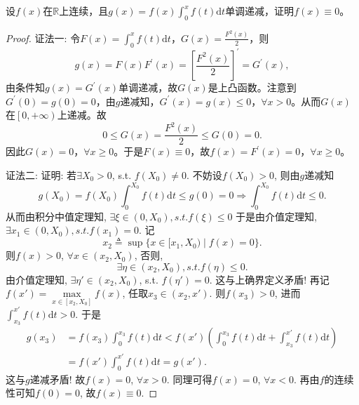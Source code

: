 \documentclass[../../main.tex]{subfiles}%
\begin{document}
\begin{example}
设$f(x)$在$\mathbb{R}$上连续，且$g(x)=f(x)\int_0^x f(t)\mathrm{d}t$单调递减，证明$f(x)\equiv 0$。
\end{example}
\begin{proof}

{\color{blue}证法一:}
令$F\left( x \right) =\int_0^x{f\left( t \right) \mathrm{d}t}$，$G\left( x \right) =\frac{F^2\left( x \right)}{2}$，则
\[
g\left( x \right) =F\left( x \right) F^\prime \left( x \right) =\left[ \frac{F^2\left( x \right)}{2} \right] ^\prime =G^\prime \left( x \right),
\]
由条件知$g\left( x \right) =G^\prime \left( x \right)$单调递减，故$G\left( x \right)$是上凸函数。注意到$G^\prime \left( 0 \right) =g\left( 0 \right) =0$，由$g$递减知，$G^\prime \left( x \right) =g\left( x \right) \leqslant 0$，$\forall x>0$。从而$G\left( x \right)$在$\left[ 0,+\infty \right)$上递减。故
\[
0\leqslant G\left( x \right) =\frac{F^2\left( x \right)}{2}\leqslant G\left( 0 \right) =0.
\]
因此$G\left( x \right) =0$，$\forall x\geqslant 0$。于是$F\left( x \right) \equiv 0$，故$f\left( x \right) =F^\prime \left( x \right) =0$，$\forall x\geqslant 0$。

{\color{blue}证法二:}
证明: 若$\exists X_0>0$, s.t. $f(X_0)\neq 0$. 不妨设$f(X_0)>0$,
则由$g$递减知
$$g(X_0)=f(X_0)\int_0^{X_0} f(t)\mathrm{d}t \leqslant g(0)=0 \Rightarrow \int_0^{X_0} f(t)\mathrm{d}t \leqslant 0.$$
从而由积分中值定理知, $\exists \xi \in (0,X_0), s.t. f(\xi) \leqslant 0$
于是由介值定理知, $\exists x_1 \in (0,X_0), s.t. f(x_1)=0.$
记
$$x_2 \triangleq \sup\{x \in [x_1,X_0) \mid f(x)=0\}.$$
则$f(x)>0$, $\forall x \in (x_2,X_0)$, 否则, $$\exists \eta \in (x_2,X_0), s.t. f(\eta) \leqslant 0.$$
由介值定理知, $\exists \eta' \in (x_2,X_0)$, s.t. $f(\eta')=0$. 这与上确界定义矛盾! 再记
$f(x') = \max\limits_{x \in [x_2,X_0]} f(x)$,
任取$x_3 \in (x_2,x')$. 则$f(x_3)>0$, 进而$\int_{x_3}^{x'} f(t)\mathrm{d}t >0$. 于是
\begin{align*}
g(x_3) &= f(x_3)\int_0^{x_3} f(t)\mathrm{d}t < f(x')\left( \int_0^{x_3} f(t)\mathrm{d}t + \int_{x_3}^{x'} f(t)\mathrm{d}t \right)\\
&= f(x')\int_0^{x'} f(t)\mathrm{d}t = g(x').
\end{align*}
这与$g$递减矛盾! 故$f(x)=0$, $\forall x>0$. 同理可得$f(x)=0$, $\forall x<0$.
再由$f$的连续性可知$f(0)=0$, 故$f(x) \equiv 0$.

\end{proof}
\end{document}
